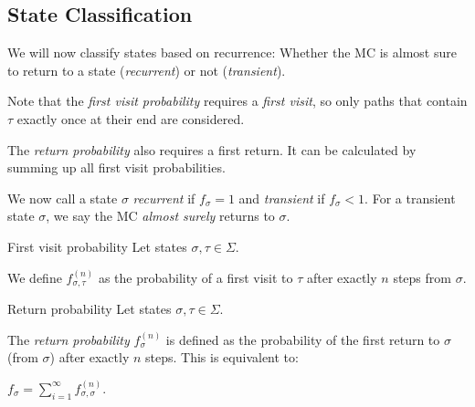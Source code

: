 \documentclass[english]{panikzettel}
\begin{document}
\subsection{State Classification}

\begin{halfboxl}
	We will now classify states based on recurrence: Whether the MC is almost sure to return to a state (\emph{recurrent}) or not (\emph{transient}).

	Note that the \emph{first visit probability} requires a \emph{first visit}, so only paths that contain $\tau$ exactly once at their end are considered.

	The \emph{return probability} also requires a first return.
	It can be calculated by summing up all first visit probabilities.

	We now call a state $\sigma$ \emph{recurrent} if $f_\sigma = 1$ and \emph{transient} if $f_\sigma < 1$.
	For a transient state $\sigma$, we say the MC \emph{almost surely} returns to $\sigma$.
\end{halfboxl}%
\begin{halfboxr}
	\vspace{-\baselineskip}
	\begin{defi}{First visit probability}
		Let states $\sigma, \tau \in \Sigma$.

		We define $f^{(n)}_{\sigma,\tau}$ as the probability of a first visit to $\tau$ after exactly $n$ steps from $\sigma$.
	\end{defi}

	\begin{defi}{Return probability}
		Let states $\sigma, \tau \in \Sigma$.

		The \emph{return probability} $f_\sigma^{(n)}$ is defined as the probability of the first return to $\sigma$ (from $\sigma$) after exactly $n$ steps.
		This is equivalent to:
		\begin{tightcenter}\large{}$f_\sigma = \sum_{i=1}^\infty f_{\sigma,\sigma}^{(n)}$.\end{tightcenter}
	\end{defi}
\end{halfboxr}
\end{document}
